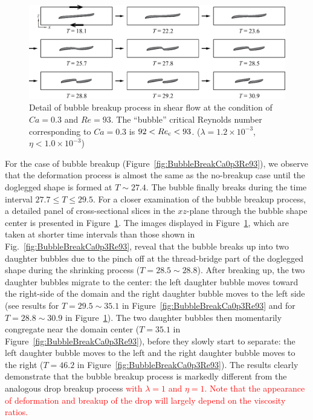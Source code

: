 \documentclass{elsarticle}
\begin{document}
%
\begin{figure}%
  \centering
  \includegraphics[width=\textwidth]{Figure/7-BubBreakCa0p3Re93Detail}
  \caption{Detail of bubble breakup process in shear flow at the condition
           of $Ca=0.3$ and $Re=93$.
	   The ``bubble'' 
	   critical Reynolds number corresponding to $Ca=0.3$ is
	   $92<Re_{\rm c}<93$.
           ($\lambda = 1.2 \times 10^{-3}$, $\eta < 1.0 \times 10^{-3}$) 
	   }
  \label{fig:BubBreakCa0p3Re93Detail}
\end{figure}
%
For the case of bubble breakup (Figure~\ref{fig:BubbleBreakCa0p3Re93}), we
observe that the deformation process is almost the same as the no-breakup case
until the doglegged shape is formed at $T \sim 27.4$. The bubble finally breaks
during the time interval $27.7 \leq T \leq 29.5$.  For a closer examination of
the bubble breakup process, a detailed panel of cross-sectional slices in the
$xz$-plane through the bubble shape center is presented in
Figure~\ref{fig:BubBreakCa0p3Re93Detail}.  The images displayed in
Figure~\ref{fig:BubBreakCa0p3Re93Detail}, which are taken at shorter time
intervals than those shown in Fig.~\ref{fig:BubbleBreakCa0p3Re93}, reveal that
the bubble breaks up into two daughter bubbles due to the pinch off at the
thread-bridge part of the doglegged shape during the shrinking process ($T =
28.5 \sim 28.8$).  After breaking up, the two daughter bubbles migrate to the
center: the left daughter bubble moves toward the right-side of the domain and
the right daughter bubble moves to the left side (see results for $T = 29.5
\sim 35.1$ in Figure~\ref{fig:BubbleBreakCa0p3Re93} and for $T = 28.8 \sim
30.9$ in Figure~\ref{fig:BubBreakCa0p3Re93Detail}).  The two daughter bubbles
then momentarily congregate near the domain center ($T = 35.1$ in
Figure~\ref{fig:BubbleBreakCa0p3Re93}), before they slowly start to separate:
the left daughter bubble moves to the left and the right daughter bubble moves
to the right ($T = 46.2$ in Figure~\ref{fig:BubbleBreakCa0p3Re93}).  The
results clearly demonstrate that the bubble breakup process is markedly
different from the analogous drop breakup process 
\textcolor{red}
{
with $\lambda = 1$ and $\eta =1$. Note that the appearance of deformation and breakup of the drop
will largely depend on the viscosity ratios.
}
\end{document}
